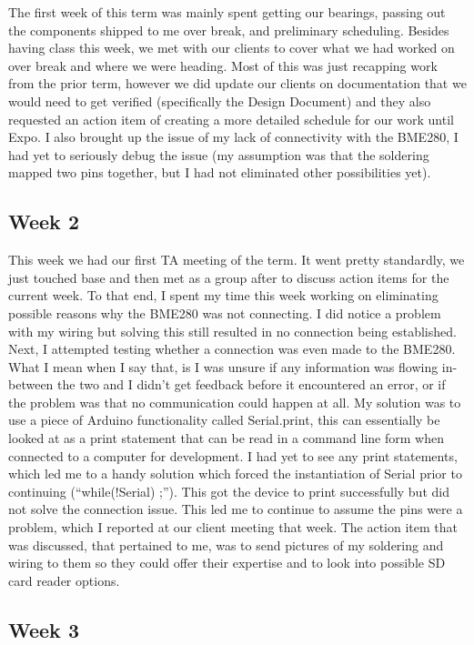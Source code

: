 \documentclass[IEEEtran,letterpaper,10pt,titlepage,fleqn,draftclsnofoot,onecolumn]{article}
\begin{document}
The first week of this term was mainly spent getting our bearings, passing out the components shipped to me over break, and preliminary scheduling. Besides having class this week, we met with our clients to cover what we had worked on over break and where we were heading. Most of this was just recapping work from the prior term, however we did update our clients on documentation that we would need to get verified (specifically the Design Document) and they also requested an action item of creating a more detailed schedule for our work until Expo. I also brought up the issue of my lack of connectivity with the BME280, I had yet to seriously debug the issue (my assumption was that the soldering mapped two pins together, but I had not eliminated other possibilities yet).

\subsection{Week 2}

This week we had our first TA meeting of the term. It went pretty standardly, we just touched base and then met as a group after to discuss action items for the current week. To that end, I spent my time this week working on eliminating possible reasons why the BME280 was not connecting. I did notice a problem with my wiring but solving this still resulted in no connection being established. Next, I attempted testing whether a connection was even made to the BME280. What I mean when I say that, is I was unsure if any information was flowing in-between the two and I didn’t get feedback before it encountered an error, or if the problem was that no communication could happen at all. My solution was to use a piece of Arduino functionality called Serial.print, this can essentially be looked at as a print statement that can be read in a command line form when connected to a computer for development. I had yet to see any print statements, which led me to a handy solution which forced the instantiation of Serial prior to continuing (“while(!Serial) ;”). This got the device to print successfully but did not solve the connection issue. This led me to continue to assume the pins were a problem, which I reported at our client meeting that week. The action item that was discussed, that pertained to me, was to send pictures of my soldering and wiring to them so they could offer their expertise and to look into possible SD card reader options. 

\subsection{Week 3}
\end{document}
